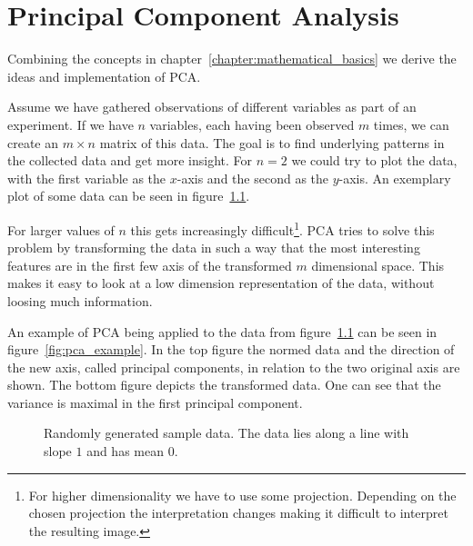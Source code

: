\chapter{Principal Component Analysis}
\label{chapter:principal_component_analysis}

Combining the concepts in chapter~\ref{chapter:mathematical_basics} we derive the ideas and implementation of PCA.

Assume we have gathered observations of different variables as part of an experiment. If we have $n$ variables, each having been observed $m$ times, we can create an $m \times n$ matrix of this data. \color{change} The goal is to find underlying patterns in the collected data and get more insight. \color{black} For $n = 2$ we could try to plot the data, with the first variable as the $x$-axis and the second as the $y$-axis. An exemplary plot of some data can be seen in figure~\ref{fig:some_nice_data}.

For larger values of $n$ this gets increasingly difficult\footnote{For higher dimensionality we have to use some projection. Depending on the chosen projection the interpretation changes making it difficult to interpret the resulting image.}. PCA tries to solve this problem by transforming the data in such a way that the most interesting features are in the first few axis of the transformed $m$ dimensional space. This makes it easy to look at a low dimension representation of the data, without loosing much information.

An example of PCA being applied to the data from figure~\ref{fig:some_nice_data} can be seen in figure~\ref{fig:pca_example}. In the top figure the normed data and the direction of the new axis, called principal components, in relation to the two original axis are shown. The bottom figure depicts the transformed data. One can see that the variance is maximal in the first principal component.

\begin{figure}[h!]
	\centering
	
	\caption{Randomly generated sample data. The data lies along a line with slope $1$ and has mean $0$.}
	\label{fig:some_nice_data}
\end{figure}

